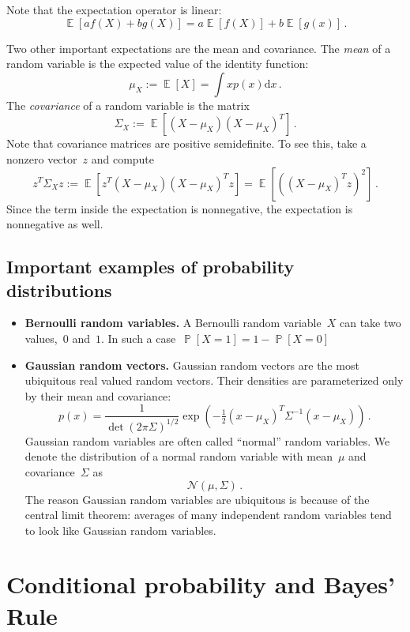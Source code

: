 \documentclass{tufte-book}
\begin{document}
Note that the expectation operator is linear: \[
  \mathop\mathbb{E}[af(X)+bg(X)] = a \mathop\mathbb{E}[f(X)] + b \mathop\mathbb{E}[g(x)] \,.
\]

Two other important expectations are the mean and covariance. The
\emph{mean} of a random variable is the expected value of the identity
function: \[
  \mu_X := \mathop\mathbb{E}[X] = \int x p(x) \mathrm{d} x\,.
\] The \emph{covariance} of a random variable is the
matrix \[
  \Sigma_X := \mathop\mathbb{E}[(X-\mu_X)(X-\mu_X)^T]\,.
\] Note that covariance matrices are positive semidefinite. To see this,
take a nonzero vector~\(z\) and compute \[
z^T \Sigma_X z := \mathop\mathbb{E}[z^T(X-\mu_X)(X-\mu_X)^Tz] = \mathop\mathbb{E}[ ((X-\mu_X)^Tz)^2]\,.
\] Since the term inside the expectation is nonnegative, the expectation
is nonnegative as well.

\hypertarget{important-examples-of-probability-distributions}{%
\subsection{Important examples of probability
distributions}\label{important-examples-of-probability-distributions}}

\begin{itemize}
\item
  \textbf{Bernoulli random variables.} A Bernoulli random variable~\(X\)
  can take two values,~\(0\) and~\(1\). In such a
  case~\(\mathop\mathbb{P}[X=1] = 1-\mathop\mathbb{P}[X=0]\)
\item
  \textbf{Gaussian random vectors.} Gaussian random vectors are the most
  ubiquitous real valued random vectors. Their densities are
  parameterized only by their mean and covariance: \[
  p(x) = \frac{1}{\operatorname{det}(2\pi \Sigma)^{1/2}} \exp\left( -\tfrac{1}{2} (x-\mu_X)^T \Sigma^{-1} (x-\mu_X) \right)\,.
  \] Gaussian random variables are often called ``normal'' random
  variables. We denote the distribution of a normal random variable with
  mean~\(\mu\) and covariance~\(\Sigma\) as \[
  \mathcal{N}(\mu,\Sigma)\,.
  \] The reason Gaussian random variables are ubiquitous is because of
  the central limit theorem: averages of many independent random
  variables tend to look like Gaussian random variables.
\end{itemize}

\hypertarget{conditional-probability-and-bayes-rule}{%
\section{Conditional probability and Bayes'
Rule}\label{conditional-probability-and-bayes-rule}}
\end{document}
